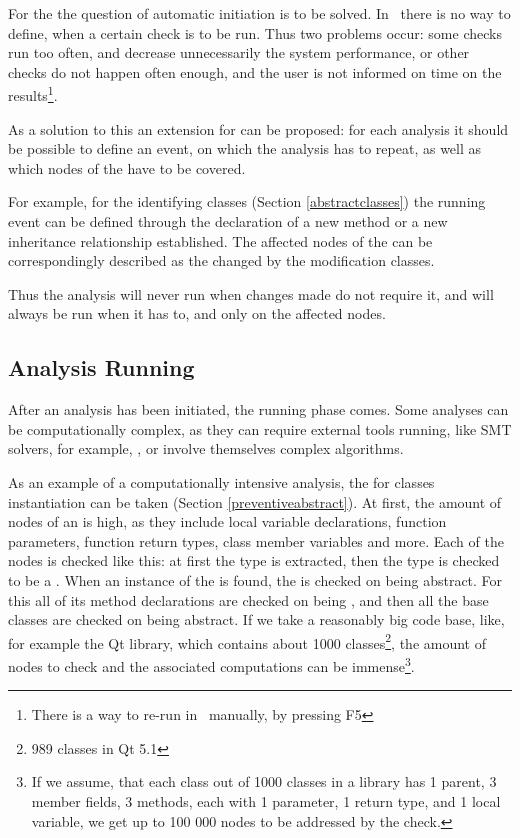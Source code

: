 For the  the question of automatic initiation is to be solved. In \jbmps\ there is no 
way to define, when a certain check is to be run. Thus two problems occur: some checks run too often, and 
decrease unnecessarily the system performance, or other checks do not happen often enough, and the user is not 
informed on time on the results\footnote{There is a way to re-run  in \jbmps\ manually,
by pressing F5}. 

As a solution to this an  extension for can be proposed: for each analysis it should be possible 
to define an event, on which the analysis has to repeat, as well as which nodes of the  have to be covered.

For example, for the  identifying  classes (Section \ref{abstractclasses}) the running
event can be defined through the declaration of a new method or a new inheritance relationship established. The 
affected nodes of the  can be correspondingly described as the changed by the modification classes.

Thus the analysis will never run when changes made do not require it, and will always be run when 
it has to, and only on the affected nodes.


\subsection{Analysis Running}

After an analysis has been initiated, the running phase comes. Some analyses can be computationally complex,
as they can require external tools running, like SMT solvers, for example, \cite{2012_ratiu_modular_dsls_and_analyses},
or involve themselves complex algorithms.


As an example of a computationally intensive analysis, the  for  classes 
instantiation can be taken (Section \ref{preventiveabstract}). At first, the amount of nodes of an  is high,
as they include local variable declarations, function parameters, function return types, class member variables
and more. Each of the nodes is checked like this: at first the type is extracted, then the type is checked to be 
a . When an instance of the  is found, the  is checked on being abstract.
For this all of its method declarations are checked on being , and then all the base classes are 
checked on being abstract. If we take a reasonably big code base, like, for example the Qt library, which contains about 1000
classes\footnote{989 classes in Qt 5.1}, the amount of nodes to check and the associated computations can be immense\footnote{If we assume,
that each class out of 1000 classes in a library has 1 parent, 3 member fields, 3 methods, each with 1 parameter, 1 return type, and 1 local variable,
we get up to 100 000 nodes to be addressed by the check.}.

